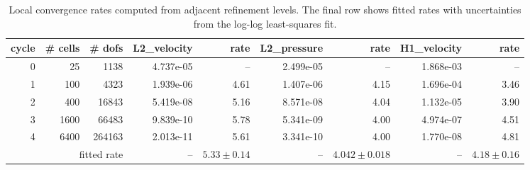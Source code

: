 \begin{table}[htbp]
\centering
\begin{tabular}{|r|r|r|r|r|r|r|r|r|}
\hline
cycle & \# cells & \# dofs & L2\_velocity & rate & L2\_pressure & rate & H1\_velocity & rate \\ \hline
0 & 25 & 1138 & 4.737e-05 & -- & 2.499e-05 & -- & 1.868e-03 & -- \\ \hline
1 & 100 & 4323 & 1.939e-06 & 4.61 & 1.407e-06 & 4.15 & 1.696e-04 & 3.46 \\ \hline
2 & 400 & 16843 & 5.419e-08 & 5.16 & 8.571e-08 & 4.04 & 1.132e-05 & 3.90 \\ \hline
3 & 1600 & 66483 & 9.839e-10 & 5.78 & 5.341e-09 & 4.00 & 4.974e-07 & 4.51 \\ \hline
4 & 6400 & 264163 & 2.013e-11 & 5.61 & 3.341e-10 & 4.00 & 1.770e-08 & 4.81 \\ \hline
\multicolumn{3}{|r|}{fitted rate} & -- & $5.33 \pm 0.14$ & -- & $4.042 \pm 0.018$ & -- & $4.18 \pm 0.16$ \\ \hline
\end{tabular}
\caption{Local convergence rates computed from adjacent refinement levels. The final row shows fitted rates with uncertainties from the log-log least-squares fit.}
\end{table}
